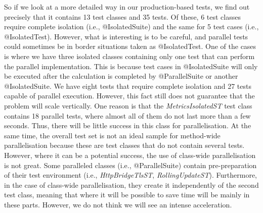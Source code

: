 So if we look at a more detailed way in our production-based tests, we find out precisely that it contains 13 test classes and 35 tests.
Of these, 6 test classes require complete isolation (i.e., @IsolatedSuite) and the same for 5 test cases (i.e., @IsolatedTest).
However, what is interesting is to be careful, and parallel tests could sometimes be in border situations taken as @IsolatedTest.
One of the cases is where we have three isolated classes containing only one test that can perform the parallel implementation.
This is because test cases in @IsolatedSuite will only be executed after the calculation is completed by @ParallelSuite or another @IsolatedSuite.
We have eight tests that require complete isolation and 27 tests capable of parallel execution.
However, this fact still does not guarantee that the problem will scale vertically.
One reason is that the \emph{MetricsIsolatedST} test class contains 18 parallel tests, where almost all of them do not last more than a few seconds.
Thus, there will be little success in this class for parallelisation.
At the same time, the overall test set is not an ideal sample for method-wide parallelisation because these are test classes that do not contain
several tests.
However, where it can be a potential success, the use of class-wide parallelisation is not great.
Some paralleled classes (i.e., @ParallelSuite) contain pre-preparation of their test environment (i.e., \emph{HttpBridgeTlsST}, \emph{RollingUpdateST}).
Furthermore, in the case of class-wide parallelisation, they create it independently of the second test class, meaning that where
it will be possible to save time will be mainly in these parts.
However, we do not think we will see an intense acceleration.


